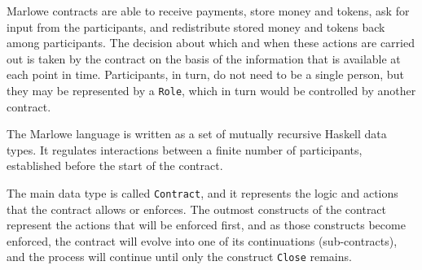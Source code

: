 \documentclass[english,runningheads]{llncs}
\begin{document}
Marlowe contracts are able to receive payments, store money and tokens,
ask for input from the participants, and redistribute stored money
and tokens back among participants. The decision about which and when
these actions are carried out is taken by the contract on the basis
of the information that is available at each point in time. Participants,
in turn, do not need to be a single person, but they may be represented
by a \texttt{Role}, which in turn would be controlled by another contract.

The Marlowe language is written as a set of mutually recursive Haskell
data types. It regulates interactions between a finite number of participants,
established before the start of the contract. 

The main data type is called \texttt{Contract}, and it represents
the logic and actions that the contract allows or enforces. The outmost
constructs of the contract represent the actions that will be enforced
first, and as those constructs become enforced, the contract will
evolve into one of its continuations (sub-contracts), and the process
will continue until only the construct \texttt{Close} remains.
\end{document}
